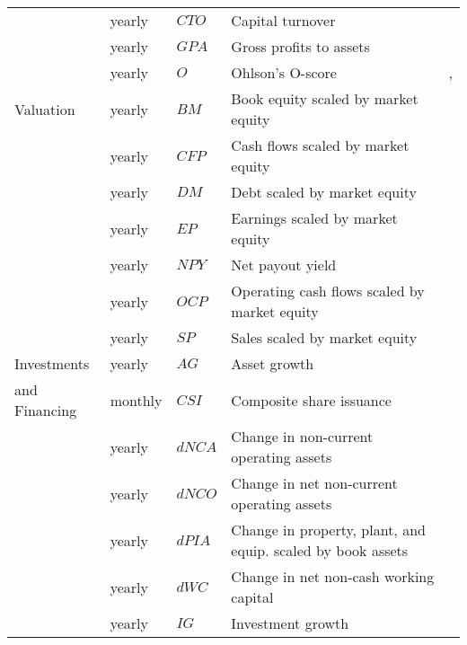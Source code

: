 \begin{landscape}
\begin{ThreePartTable}
\begin{center}
\begin{footnotesize}
\begin{longtabu}{l l l l l}
                        \rule{0pt}{3ex}
						  & yearly & $CTO$ & Capital turnover  & \cite{ha/ba/1996} \\
                        \rule{0pt}{3ex}
						  & yearly & $GPA$ & Gross profits to assets  & \cite{no/2013} \\
                        \rule{0pt}{3ex}
						  & yearly & $O$ & Ohlson's O-score  & \cite{oh/1980}, \cite{di/1998} \\
						\hline 
						\rule{0pt}{3ex}
						Valuation & yearly & $BM$ & Book equity scaled by market equity & \cite{da/fa/fr/2000} \\
						\rule{0pt}{3ex}
						 & yearly & $CFP$ & Cash flows scaled by market equity & \cite{la/sh/vi/1994} \\
                      \rule{0pt}{3ex}
						 & yearly & $DM$ & Debt scaled by market equity & \cite{bh/1988} \\
						 \rule{0pt}{3ex}
						 & yearly & $EP$ & Earnings scaled by market equity & \cite{ba/1983} \\
						 \rule{0pt}{3ex}
						 & yearly & $NPY$ & Net payout yield & \cite{bo/mi/ri/ro/2007} \\
						 \rule{0pt}{3ex}
						 & yearly & $OCP$ & Operating cash flows scaled by market equity & \cite{de/ra/ve/2004} \\
						 \rule{0pt}{3ex}
						 & yearly & $SP$ & Sales scaled by market equity & \cite{ba/mu/ra/1996} \\
						 \hline 
						 \rule{0pt}{3ex}
						Investments & yearly & $AG$ & Asset growth & \cite{co/gu/sc/2008} \\
						  \rule{0pt}{3ex}
						  and Financing& monthly & $CSI$ & Composite share issuance & \cite{da/ti/2006} \\
						\rule{0pt}{3ex}
                        & yearly & $dNCA$ & Change in non-current operating assets & \cite{ri/sl/so/tu/2005} \\
						\rule{0pt}{3ex}
						& yearly & $dNCO$ & Change in net non-current operating assets & \cite{ri/sl/so/tu/2005} \\
						\rule{0pt}{3ex}
						& yearly & $dPIA$ & Change in property, plant, and equip. scaled by book assets & \cite{ly/su/zh/2008} \\
						\rule{0pt}{3ex}
						& yearly & $dWC$ & Change in net non-cash working capital & \cite{ri/sl/so/tu/2005} \\
						\rule{0pt}{3ex}
						& yearly & $IG$ & Investment growth & \cite{xi/2008} \\

\end{longtabu}
\end{footnotesize}
\end{center}
\end{ThreePartTable}
\end{landscape}
